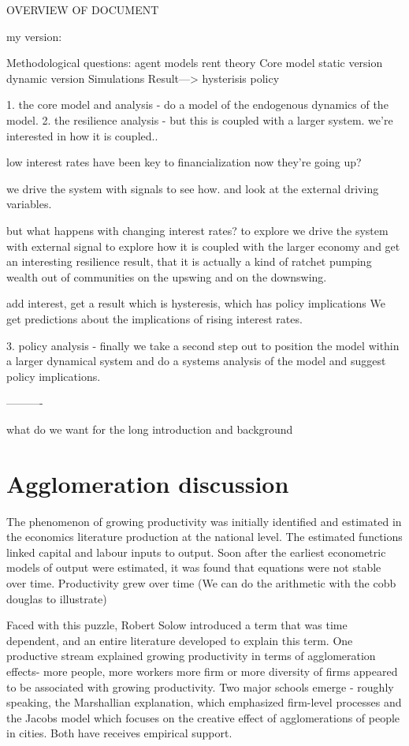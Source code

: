 OVERVIEW OF DOCUMENT

my version:

Methodological questions: 
    agent models 
    rent theory
Core model
    static version
    dynamic version
Simulations
Result---> hysterisis
policy



1. the core model and analysis - do a model of the endogenous dynamics of the model.
2. the resilience analysis -
but this is coupled with a larger system. we're interested in how it is coupled..

low interest rates have been key to financialization 
now they're going up?

we drive the system with signals to see how. and look at the external driving variables.

but what happens with changing interest rates? to explore we drive the system with external signal to explore how it is coupled with the larger economy and get an interesting resilience result, that it is actually a kind of ratchet pumping wealth out of communities on the upswing and on the downswing.

add interest, get a result which is hysteresis, which has policy implications
We get predictions about the implications of rising interest rates.

3.  policy analysis - finally we take a second step out to position the model within a larger dynamical system and do a systems analysis of the model and suggest policy implications. 

----------

what do we want for the long introduction and background

\section{Agglomeration discussion}

The phenomenon of growing productivity was initially identified and estimated in the economics literature production at the national level. The estimated functions linked capital and labour inputs to output.  Soon after the  earliest econometric models of output  were estimated, it was found that equations were not stable over time. Productivity grew over time
(We can do the arithmetic with the cobb douglas to illustrate) 

Faced with this puzzle, Robert Solow introduced a term that was time dependent, and an entire literature developed to explain this term. One productive stream explained growing productivity in terms of agglomeration effects- more people, more workers more firm or more diversity of firms appeared to be associated with growing productivity. Two major schools emerge - roughly speaking,  the Marshallian explanation, which emphasized firm-level processes and the Jacobs model which focuses on the creative effect of agglomerations of people in cities. Both have receives empirical support.

